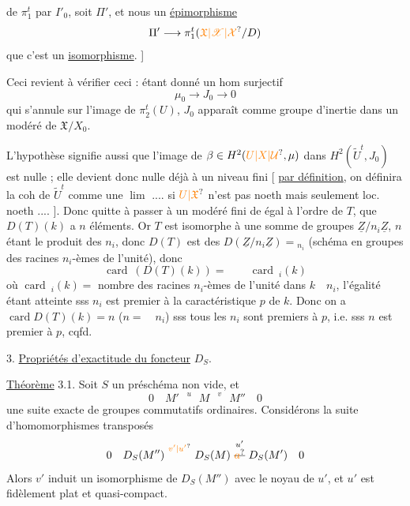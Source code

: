de $\pi_1^t$ par $I'_0$, soit  $\Pi'$, et nous   un \uline{épimorphisme}
\[
 \Pi'\longrightarrow\pi_1^t(\unsure{\mathfrak X|\mathscr X|\mathcal X}/D)
\]
 que c'est un \uline{isomorphisme}. ]

Ceci revient à vérifier ceci : étant donné un hom surjectif
\[
 \mu_0\longrightarrow J_0\longrightarrow0
\]
qui s'annule sur l'image de $\pi_2^t(U)$,  $J_0$ apparaît comme groupe d'inertie dans un   modéré de $\mathfrak X/X_0$.

L'hypothèse signifie aussi que l'image de $\beta\in H^2(\unsure{U|X|\mathcal U},\mu)$ dans $H^2(\widetilde U^t,J_0)$ est nulle ; elle devient donc nulle déjà  à un niveau fini [ \uline{par définition}, on définira la coh de $\widetilde U^t$ comme une \uline{$\lim$} .... si $\unsure{U|\mathfrak X}$ n'est pas noeth  mais seulement loc. noeth .... ]. Donc quitte à passer à un  modéré fini de    
égal à l'ordre  de $T$, que $D(T)(k)$ a  $n$ éléments. Or $T$ est isomorphe à une somme de groupes $\underline Z/n_i\underline Z$, $n$ étant le produit des $n_i$, donc $D(T)$ est  des $D(\underline Z/n_i\underline Z)={}_{n_i}$ (schéma en groupes des racines $n_i$-èmes de l'unité), donc
\[
 \operatorname{card}\ (D(T)(k))=\qquad\operatorname{card}\ {}_i(k)
\]
où $\operatorname{card}\ {}_i(k)={}$ nombre des racines $n_i$-èmes de l'unité dans $k\quad n_i$, l'égalité étant atteinte sss $n_i$ est premier à la caractéristique $p$ de $k$. Donc on a $\operatorname{card} D(T)(k)=n$  ($n=\quad n_i$) sss tous les $n_i$ sont premiers à $p$, i.e. sss $n$ est premier à $p$, cqfd.

3. \uline{Propriétés d'exactitude du foncteur} $D_S$.

\uline{Théorème} 3.1. Soit $S$ un préschéma non vide,  et
\[
 0\quad M'\ \overset{u}{\phantom{=}}\ M\ \overset{v}{\phantom{=}}\ M''\quad 0
\]
une suite exacte de groupes commutatifs ordinaires. Considérons la suite d'homomorphismes transposés
\[
 0\quad D_S(M'')\ \overset{\unsure{v'|u'}}{\phantom{=}}\ D_S(M)\
 \overset{u'}{\deleted{\unsure{a}}}\ D_S(M')\quad0
\]
Alors $v'$ induit un isomorphisme de  $D_S(M'')$ avec le noyau de $u'$, et $u'$ est fidèlement plat et quasi-compact.

